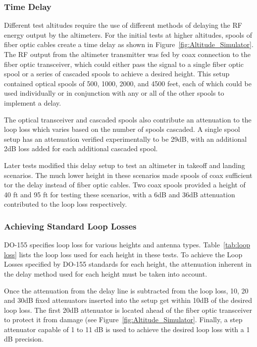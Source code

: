 \subsubsection{Time Delay}\label{subsub:delay}
Different test altitudes require the use of different methods of delaying the RF energy output by the altimeters. For the initial tests at higher altitudes, spools of fiber optic cables create a time delay as shown in Figure~\ref{fig:Altitude_Simulator}. The RF output from the altimeter transmitter was fed by coax connection to the fiber optic transceiver, which could either pass the signal to a single fiber optic spool or a series of cascaded spools to achieve a desired height. This setup contained optical spools of 500, 1000, 2000, and 4500 feet, each of which could be used individually or in conjunction with any or all of the other spools to implement a delay.

 The optical transceiver and cascaded spools also contribute an attenuation to the loop loss which varies based on the number of spools cascaded. A single spool setup has an attenuation verified experimentally to be 29dB, with an additional 2dB loss added for each additional cascaded spool.

Later tests modified this delay setup to test an altimeter in takeoff and landing scenarios. The much lower height in these scenarios made spools of coax sufficient tor the delay instead of fiber optic cables. Two coax spools provided a height of 40 ft and 95 ft for testing these scenarios, with a 6dB and 36dB attenuation contributed to the loop loss respectively.  

\subsubsection{Achieving Standard Loop Losses}\label{subsub:loss}
DO-155 specifies loop loss for various heights and antenna types. Table~\ref{tab:loop loss} lists the loop loss used for each height in these tests. To achieve the Loop Losses specified by DO-155 standards for each height, the attenuation inherent in the delay method used for each height must be taken into account. 

Once the attenuation from the delay line is subtracted from the loop loss, 10, 20 and 30dB fixed attenuators inserted into the setup get within 10dB of the desired loop loss. The first 20dB attenuator is located ahead of the fiber optic transceiver to protect it from damage (see Figure~\ref{fig:Altitude_Simulator}.  Finally, a step attenuator capable of 1 to 11 dB is used to achieve the desired loop loss with a 1 dB precision. 

